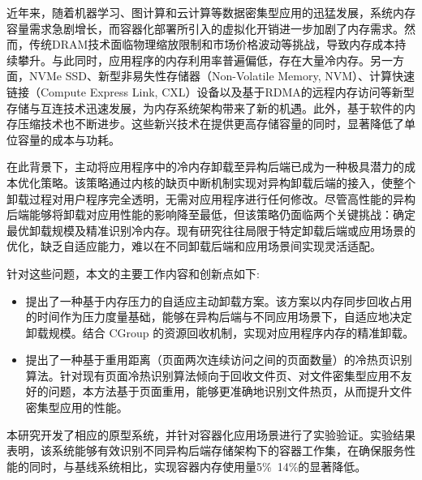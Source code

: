 	
\begin{chineseabstract}

近年来，随着机器学习、图计算和云计算等数据密集型应用的迅猛发展，系统内存容量需求急剧增长，而容器化部署所引入的虚拟化开销进一步加剧了内存需求。然而，传统DRAM技术面临物理缩放限制和市场价格波动等挑战，导致内存成本持续攀升。与此同时，应用程序的内存利用率普遍偏低，存在大量冷内存。另一方面，NVMe SSD、新型非易失性存储器（Non-Volatile Memory, NVM）、计算快速链接（Compute Express Link, CXL）设备以及基于RDMA的远程内存访问等新型存储与互连技术迅速发展，为内存系统架构带来了新的机遇。此外，基于软件的内存压缩技术也不断进步。这些新兴技术在提供更高存储容量的同时，显著降低了单位容量的成本与功耗。

在此背景下，主动将应用程序中的冷内存卸载至异构后端已成为一种极具潜力的成本优化策略。该策略通过内核的缺页中断机制实现对异构卸载后端的接入，使整个卸载过程对用户程序完全透明，无需对应用程序进行任何修改。尽管高性能的异构后端能够将卸载对应用性能的影响降至最低，但该策略仍面临两个关键挑战：确定最优卸载规模及精准识别冷内存。现有研究往往局限于特定卸载后端或应用场景的优化，缺乏自适应能力，难以在不同卸载后端和应用场景间实现灵活适配。

针对这些问题，本文的主要工作内容和创新点如下:
\begin{itemize}
    \item 提出了一种基于内存压力的自适应主动卸载方案。该方案以内存同步回收占用的时间作为压力度量基础，能够在异构后端与不同应用场景下，自适应地决定卸载规模。结合 CGroup 的资源回收机制，实现对应用程序内存的精准卸载。
    \item 提出了一种基于重用距离（页面两次连续访问之间的页面数量）的冷热页识别算法。针对现有页面冷热识别算法倾向于回收文件页、对文件密集型应用不友好的问题，本方法基于页面重用，能够更准确地识别文件热页，从而提升文件密集型应用的性能。
\end{itemize}

本研究开发了相应的原型系统，并针对容器化应用场景进行了实验验证。实验结果表明，该系统能够有效识别不同异构后端存储架构下的容器工作集，在确保服务性能的同时，与基线系统相比，实现容器内存使用量5\%~14\%的显著降低。

\end{chineseabstract}